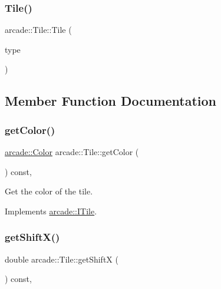 \subsubsection{\texorpdfstring{Tile()}{Tile()}}
{\footnotesize\ttfamily arcade\+::\+Tile\+::\+Tile (\begin{DoxyParamCaption}\item[{\hyperlink{namespacearcade_a61ba576694ea309cdf2b4b66902408ca}{Tile\+Type}}]{type }\end{DoxyParamCaption})}



\subsection{Member Function Documentation}
\mbox{\label{classarcade_1_1_tile_a33f158dcb0b991ca565562a41ede70ba}} 
\subsubsection{\texorpdfstring{get\+Color()}{getColor()}}
{\footnotesize\ttfamily \hyperlink{unionarcade_1_1_color}{arcade\+::\+Color} arcade\+::\+Tile\+::get\+Color (\begin{DoxyParamCaption}{ }\end{DoxyParamCaption}) const\hspace{0.3cm}{\ttfamily [override]}, {\ttfamily [virtual]}}



Get the color of the tile. 



Implements \hyperlink{classarcade_1_1_i_tile_adb20cb553bc2ce17dc23125eb70b8329}{arcade\+::\+I\+Tile}.

\mbox{\label{classarcade_1_1_tile_a0db817dd3b7e0872e90d703bfea16005}} 
\subsubsection{\texorpdfstring{get\+Shift\+X()}{getShiftX()}}
{\footnotesize\ttfamily double arcade\+::\+Tile\+::get\+ShiftX (\begin{DoxyParamCaption}{ }\end{DoxyParamCaption}) const\hspace{0.3cm}{\ttfamily [override]}, {\ttfamily [virtual]}}



